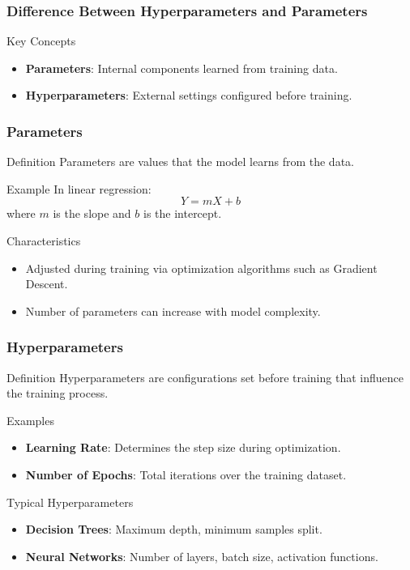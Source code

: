 \documentclass[aspectratio=169]{beamer}
\begin{document}
\begin{frame}[fragile]
    \frametitle{Difference Between Hyperparameters and Parameters}
    \begin{block}{Key Concepts}
        \begin{itemize}
            \item \textbf{Parameters}: Internal components learned from training data.
            \item \textbf{Hyperparameters}: External settings configured before training.
        \end{itemize}
    \end{block}
\end{frame}

\begin{frame}[fragile]
    \frametitle{Parameters}
    \begin{block}{Definition}
        Parameters are values that the model learns from the data.
    \end{block}
    \begin{block}{Example}
        In linear regression: 
        \[
        Y = mX + b
        \]
        where $m$ is the slope and $b$ is the intercept.
    \end{block}
    \begin{block}{Characteristics}
        \begin{itemize}
            \item Adjusted during training via optimization algorithms such as Gradient Descent.
            \item Number of parameters can increase with model complexity.
        \end{itemize}
    \end{block}
\end{frame}

\begin{frame}[fragile]
    \frametitle{Hyperparameters}
    \begin{block}{Definition}
        Hyperparameters are configurations set before training that influence the training process.
    \end{block}
    \begin{block}{Examples}
        \begin{itemize}
            \item \textbf{Learning Rate}: Determines the step size during optimization.
            \item \textbf{Number of Epochs}: Total iterations over the training dataset.
        \end{itemize}
    \end{block}
    \begin{block}{Typical Hyperparameters}
        \begin{itemize}
            \item \textbf{Decision Trees}: Maximum depth, minimum samples split.
            \item \textbf{Neural Networks}: Number of layers, batch size, activation functions.
        \end{itemize}
    \end{block}
\end{frame}
\end{document}
